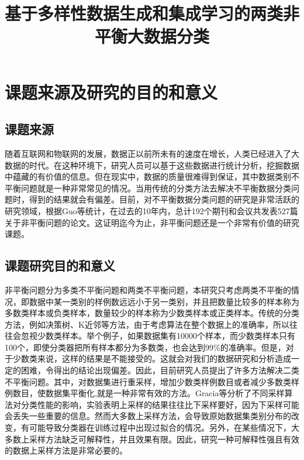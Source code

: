 \documentclass{article}
\title{基于多样性数据生成和集成学习的两类非平衡大数据分类}  %
\author{}   %
\date{}       %
\newcommand{\upcite}[1]{\textsuperscript{\textsuperscript{\cite{#1}}}} %
\begin{document}
\maketitle          %
\section{课题来源及研究的目的和意义}
\subsection{课题来源}
    随着互联网和物联网的发展，数据正以前所未有的速度在增长，人类已经进入了大数据的时代。在这种环境下，研究人员可以基于这些数据进行统计分析，挖掘数据中蕴藏的有价值的信息。但在现实中，数据的质量很难得到保证，其中数据类别不平衡问题就是一种非常常见的情况。当用传统的分类方法去解决不平衡数据分类问题时，得到的结果就会有偏差。目前，对不平衡数据分类问题的研究是非常活跃的研究领域，根据Guo等\upcite{haixiang2017learning}统计，在过去的10年内，总计192个期刊和会议共发表527篇关于非平衡问题的论文。这证明迄今为止，非平衡问题还是一个非常有价值的研究课题。
\subsection{课题研究目的和意义}
非平衡问题分为多类不平衡问题和两类不平衡问题\upcite{sun2009classification}，本研究只考虑两类不平衡的情况，即数据中某一类别的样例数远远小于另一类别，并且把数量比较多的样本称为多数类样本或负类样本，数量较少的样本称为少数类样本或正类样本\upcite{Wang2012Multiclass,he2008learning,van2009knowledge}。传统的分类方法，例如决策树、K近邻等方法，由于考虑算法在整个数据上的准确率，所以往往会忽视少数类样本。举个例子，如果数据集有10000个样本，而少数类样本只有100个，即使分类器把所有样本都分为多数类，也会达到99\%的准确率。但是，对于少数类来说，这样的结果是不能接受的。这就会对我们的数据研究和分析造成一定的困难，令得出的结论出现偏差。因此，目前研究人员提出了许多方法解决二类不平衡问题。其中，对数据集进行重采样，增加少数类样例数目或者减少多数类样例数目，使数据集平衡化,就是一种非常有效的方法。Gracia等\upcite{garcia2012effectiveness}分析了不同采样算法对分类性能的影响，实验表明上采样的结果往往比下采样要好，因为下采样可能会丢失一些重要的信息。然而大多数上采样方法，会导致原始数据集类别分布的改变，有可能导致分类器在训练过程中出现过拟合的情况。另外，在某些情况下，大多数上采样方法缺乏可解释性，并且效果有限。因此，研究一种可解释性强且有效的数据上采样方法是非常必要的。
\end{document}
